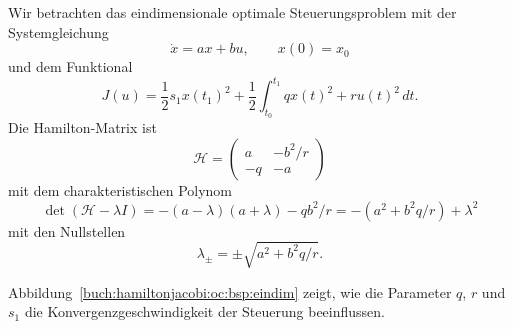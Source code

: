 %

\begin{beispiel}
\label{buch:hamiltonjacobi:oc:bsp:eindim}

Wir betrachten das eindimensionale optimale Steuerungsproblem mit
der Systemgleichung
\[
\dot x
=
ax + bu,
\qquad
x(0)=x_0
\]
und dem Funktional
\[
J(u)
=
\frac12 s_1x(t_1)^2
+
\frac12
\int_{t_0}^{t_1}
qx(t)^2 + ru(t)^2
\,dt.
\]
Die Hamilton-Matrix ist
\[
\mathscr{H}
=
\begin{pmatrix}
 a& -b^2/r \\
-q& -a
\end{pmatrix}
\]
mit dem charakteristischen Polynom
\[
\det (\mathscr{H}-\lambda I)
=
-(a-\lambda)(a+\lambda)-qb^2/r
=
-(a^2+b^2q/r) + \lambda^2 
\]
mit den Nullstellen
\[
\lambda_\pm
=
\pm \sqrt{a^2 +b^2q/r}.
\]

Abbildung~\ref{buch:hamiltonjacobi:oc:bsp:eindim} zeigt, wie die Parameter
$q$, $r$ und $s_1$ die Konvergenzgeschwindigkeit der Steuerung beeinflussen.
\end{beispiel}
